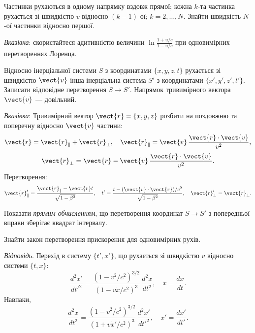 \begin{problem}
Частинки рухаються в одному напрямку вздовж прямої; кожна $k$-та частинка рухається зі швидкістю $v$ відносно
$(k-1)$-ої; $k=2,\dots,N$. Знайти швидкість $N$-ої частинки відносно першої.

\emph{Вказівка}: скористайтеся адитивністю величини $\ln\frac{1 + u/c}{1 - u/c}$ при одновимірних перетвореннях Лоренца.
\end{problem}

\begin{problem}\label{prb:1.4} Відносно інерціальної системи $S$ з координатами $\{ x,y,z,t\}$ рухається зі швидкістю
$\vect{v}$ інша інерціальна система $S'$ з координатами $\{ x',y',z',t'\}$. Записати відповідне перетворення $S
\rightarrow S'$. Напрямок тривимірного вектора $\vect{v}$ --- довільний.

\emph{Вказівка}: Тривимірний вектор $\vect{r} = \{ x,y,z\}$ розбити на поздовжню та поперечну відносно $\vect{v}$
частини:
\[
\vect{r} = \vect{r}_{\parallel} + \vect{r}_{\bot},\quad
\vect{r}_{\parallel} = \vect{v}\,\frac{\vect{r} \cdot \vect{v}}{v^{2}},
\]
\[
\vect{r}_{\bot} = \vect{r} - \vect{v}\,\frac{\vect{r} \cdot \vect{v}}{v^{2}}.
\]
Перетворення:
\[
\vect{r}_{\parallel}' = \frac{\vect{r}_{\parallel} - \vect{v}t}{\sqrt{1 - \beta^{2}}},\quad
t' = \frac{t - (\vect{v} \cdot \vect{r})/c^{2}}{\sqrt{1 - \beta^{2}}},\quad
\vect{r}_{\bot}' = \vect{r}_{\bot}.
\]
\end{problem}

\begin{problem}
Показати \emph{прямим обчисленням}, що перетворення координат $S \rightarrow S'$ з попередньої вправи зберігає квадрат
інтервалу.
\end{problem}

\begin{problem}\label{prb:1.6} Знайти закон перетворення прискорення для одновимірних рухів.

\emph{Відповідь}. Перехід в систему $\{ t',x'\}$, що рухається зі швидкістю $v$ відносно системи $\{ t,x\}$:
\[
\frac{d^{2}x'}{dt'^{2}} = \frac{(1 - v^{2}/c^{2})^{3/2}}{(1 - v\dot{x}/c^{2})^{3}}\,\frac{d^{2}x}{dt^{2}},\quad \dot{x} = \frac{dx}{dt}.
\]
Навпаки,
\[
\frac{d^{2}x}{dt^{2}} = \frac{(1 - v^{2}/c^{2})^{3/2}}{(1 + v\dot{x}'/c^{2})^{3}}\,\frac{d^{2}x'}{dt'^{2}},\quad \dot{x}' = \frac{dx'}{dt'}.
\]
\end{problem}

